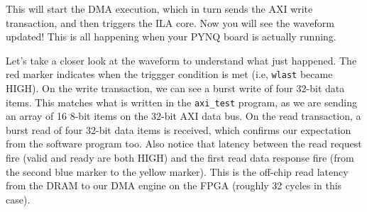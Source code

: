 \documentclass[11pt]{article}
\begin{document}
\begin{center}
\end{center}

This will start the DMA execution, which in turn sends the AXI write transaction, and then triggers the ILA core. Now you will see the waveform updated! This is all happening when your PYNQ board is actually running.

\begin{center}
\end{center}

Let's take a closer look at the waveform to understand what just happened. The red marker indicates when the triggger condition is met (i.e, \verb|wlast| became HIGH). On the write transaction, we can see a burst write of four 32-bit data items. This matches what is written in the \verb|axi_test| program, as we are sending an array of 16 8-bit items on the 32-bit AXI data bus. On the read transaction, a burst read of four 32-bit data items is received, which confirms our expectation from the software program too. Also notice that latency between the read request fire (valid and ready are both HIGH) and the first read data response fire (from the second blue marker to the yellow marker). This is the off-chip read latency from the DRAM to our DMA engine on the FPGA (roughly 32 cycles in this case).
\end{document}
